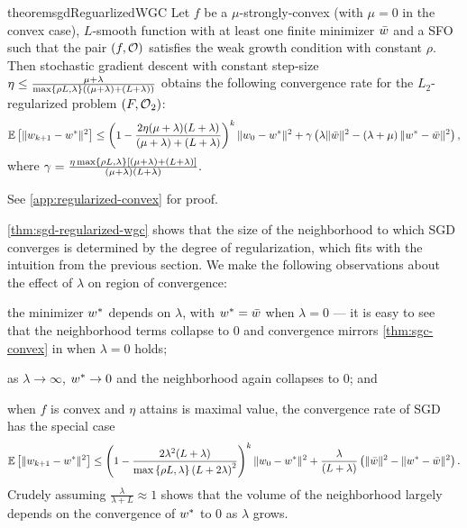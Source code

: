 \begin{restatable}{theorem}{sgdReguarlizedWGC}\label{thm:sgd-regularized-wgc}
    Let \( f \) be a \( \mu \)-strongly-convex (with \( \mu = 0 \) in the convex case), \( L \)-smooth function with at least one finite minimizer \( \wbar \) and \oracle{} a \ac{SFO} such that the pair \( \rbr{f, \oracle{}} \) satisfies the weak growth condition with constant \( \rho \).
    Then stochastic gradient descent with constant step-size \( \eta \leq \frac{\mu + \lambda}{\max\cbr{\rho L, \lambda}\rbr{(\mu + \lambda) + (L + \lambda)}} \) obtains the following convergence rate for the \( L_2 \)-regularized problem \( \rbr{F, \oracle{}_2} \):
    \[  \E\sbr{\norm{\wkk - \wopt}^2} \leq \rbr{1 - \frac{2 \eta (\mu + \lambda)(L + \lambda)}{(\mu + \lambda) + (L + \lambda)}}^k \norm{\w_0 - \wopt}^2 + \gamma\rbr{\lambda \norm{\wbar}^2 - \rbr{\lambda + \mu}\norm{\wopt - \wbar}^2}, \]
    where \( \gamma = \frac{\eta \max\cbr{\rho L, \lambda} \sbr{(\mu + \lambda) + (L + \lambda)}}{(\mu + \lambda)(L + \lambda)}. \)  
\end{restatable}
\noindent See \autoref{app:regularized-convex} for proof. \hfill \break

\autoref{thm:sgd-regularized-wgc} shows that the size of the neighborhood to which \ac{SGD} converges is determined by the degree of regularization, which fits with the intuition from the previous section.
We make the following observations about the effect of \( \lambda \) on region of convergence:
\begin{inparaenum}[(i)]
\item the minimizer \( \wopt \) depends on \( \lambda \), with \( \wopt = \wbar \) when \( \lambda = 0 \) --- it is easy to see that the neighborhood terms collapse to \( 0 \) and convergence mirrors \autoref{thm:sgc-convex} in when \( \lambda = 0 \) holds;
\item as \( \lambda \rightarrow \infty \), \( \wopt \rightarrow 0 \) and the neighborhood again collapses to \( 0 \); and 
\item when \( f \) is convex and \( \eta \) attains is maximal value, the convergence rate of \ac{SGD} has the special case 
\[  \E\sbr{\norm{\wkk - \wopt}^2} \leq \rbr{1 - \frac{2 \lambda^2(L + \lambda)}{\max\cbr{\rho L, \lambda} \rbr{L + 2\lambda}^2}}^k \norm{\w_0 - \wopt}^2 + \frac{\lambda}{\rbr{L + \lambda}}\rbr{\norm{\wbar}^2 - \norm{\wopt - \wbar}^2}. \]
Crudely assuming \( \frac{\lambda}{\lambda + L} \approx 1 \) shows that the volume of the neighborhood largely depends on the convergence of \( \wopt \) to \( 0 \) as \( \lambda \) grows.
\end{inparaenum}

